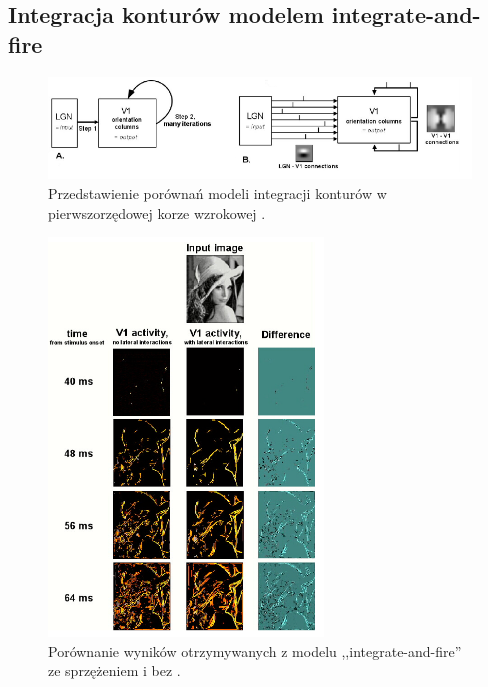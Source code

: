 \subsection{Integracja konturów modelem integrate-and-fire}
\label{integracjaSPIKE}

\begin{figure}[ht]
	\centering
	\includegraphics[width=1\textwidth]{images/spike_model.png}
	\caption{Przedstawienie porównań modeli integracji konturów w pierwszorzędowej korze wzrokowej \cite{Vanrullen2001}.}
	\label{fig:spike_model}
\end{figure}



\begin{figure}[ht]
	\centering
	\includegraphics[width=0.65\textwidth]{images/spike_model_results.png}
	\caption{Porównanie wyników otrzymywanych z modelu ,,integrate-and-fire'' ze sprzężeniem i bez \cite{Vanrullen2001}.}
	\label{fig:spike_model_results}
\end{figure}

